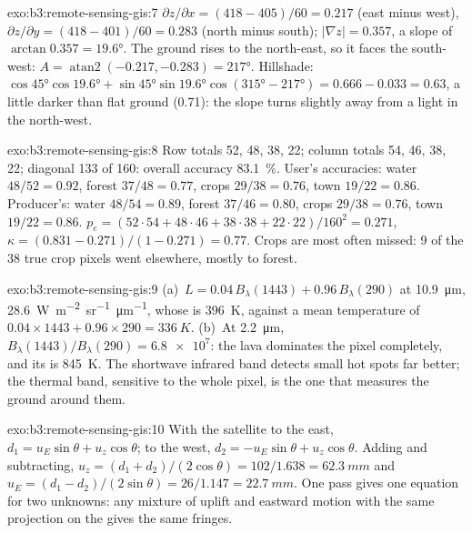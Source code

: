 \begin{solution}{exo:b3:remote-sensing-gis:7}
$\partial z/\partial x = (418 - 405)/60 = 0.217$ (east minus west),
$\partial z/\partial y = (418 - 401)/60 = 0.283$ (north minus south);
$|\nabla z| = 0.357$, a slope of $\arctan 0.357 = \ang{19.6}$. The ground
rises to the north-east, so it faces the south-west: $A =
\operatorname{atan2}(-0.217, -0.283) = \ang{217}$. Hillshade: $\cos\ang{45}
\cos\ang{19.6} + \sin\ang{45}\sin\ang{19.6}\cos(\ang{315} - \ang{217}) =
0.666 - 0.033 = 0.63$, a little darker than flat ground (0.71): the slope
turns slightly away from a light in the north-west.
\end{solution}

\begin{solution}{exo:b3:remote-sensing-gis:8}
Row totals 52, 48, 38, 22; column totals 54, 46, 38, 22; diagonal 133 of
160: overall accuracy \qty{83.1}{\percent}. User's accuracies: water
$48/52 = 0.92$, forest $37/48 = 0.77$, crops $29/38 = 0.76$, town
$19/22 = 0.86$. Producer's: water $48/54 = 0.89$, forest $37/46 = 0.80$,
crops $29/38 = 0.76$, town $19/22 = 0.86$. $p_e = (52\cdot54 + 48\cdot46 +
38\cdot38 + 22\cdot22)/160^2 = 0.271$, $\kappa = (0.831 - 0.271)/(1 -
0.271) = 0.77$. Crops are most often missed: 9 of the 38 true crop pixels
went elsewhere, mostly to forest.
\end{solution}

\begin{solution}{exo:b3:remote-sensing-gis:9}
(a)~$L = 0.04\,B_\lambda(1443) + 0.96\,B_\lambda(290)$ at
\qty{10.9}{\micro\metre}, \qty{28.6}{W.m^{-2}.sr^{-1}.\micro\metre^{-1}},
whose  is \qty{396}{K}, against a mean temperature of
$0.04\times1443 + 0.96\times290 = \qty{336}{K}$. (b)~At
\qty{2.2}{\micro\metre}, $B_\lambda(1443)/B_\lambda(290) = \num{6.8e7}$:
the lava dominates the pixel completely, and its  is
\qty{845}{K}. The shortwave infrared band detects small hot spots far
better; the thermal band, sensitive to the whole pixel, is the one that
measures the ground around them.
\end{solution}

\begin{solution}{exo:b3:remote-sensing-gis:10}
With the satellite to the east, $d_1 = u_E\sin\theta + u_z\cos\theta$; to
the west, $d_2 = -u_E\sin\theta + u_z\cos\theta$. Adding and subtracting,
$u_z = (d_1 + d_2)/(2\cos\theta) = 102/1.638 = \qty{62.3}{mm}$ and $u_E =
(d_1 - d_2)/(2\sin\theta) = 26/1.147 = \qty{22.7}{mm}$. One pass gives one
equation for two unknowns: any mixture of uplift and eastward motion with
the same projection on the  gives the same fringes.
\end{solution}

